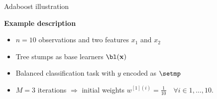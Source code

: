 \documentclass[11pt,compress,t,notes=noshow, xcolor=table]{beamer}
\begin{document}
\begin{vbframe}{Adaboost illustration}
\begin{footnotesize}

\textbf{Example description}

\begin{itemize}
  \item $n = 10$ observations and two features $x_1$ and $x_2$ 
  \item Tree stumps as base learners $\bl(\xv)$
  \item Balanced classification task with $y$ encoded as $\setmp$
  \item $M = 3$ iterations $\Rightarrow$ initial weights 
  $w^{[1](i)} = \frac{1}{10} \quad \forall i \in 1,\dots ,10$. 
\end{itemize}

\vfill


\end{footnotesize}
\end{vbframe}
\end{document}
